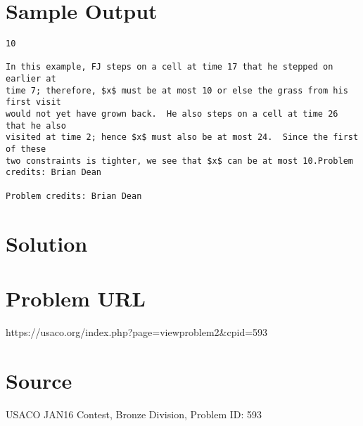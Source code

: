 \documentclass[12pt]{article}
\begin{document}
\section*{Sample Output}
\begin{verbatim}
10

In this example, FJ steps on a cell at time 17 that he stepped on earlier at
time 7; therefore, $x$ must be at most 10 or else the grass from his first visit
would not yet have grown back.  He also steps on a cell at time 26 that he also
visited at time 2; hence $x$ must also be at most 24.  Since the first of these
two constraints is tighter, we see that $x$ can be at most 10.Problem credits: Brian Dean

Problem credits: Brian Dean
\end{verbatim}

\section*{Solution}


\section*{Problem URL}
https://usaco.org/index.php?page=viewproblem2&cpid=593

\section*{Source}
USACO JAN16 Contest, Bronze Division, Problem ID: 593
\end{document}
